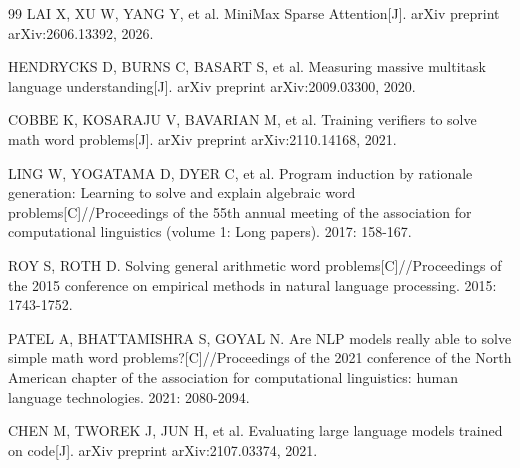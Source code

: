 \begin{thebibliography}{99}
LAI X, XU W, YANG Y, et al. MiniMax Sparse Attention[J]. arXiv preprint arXiv:2606.13392, 2026.

HENDRYCKS D, BURNS C, BASART S, et al. Measuring massive multitask language understanding[J]. arXiv preprint arXiv:2009.03300, 2020.

COBBE K, KOSARAJU V, BAVARIAN M, et al. Training verifiers to solve math word problems[J]. arXiv preprint arXiv:2110.14168, 2021.

LING W, YOGATAMA D, DYER C, et al. Program induction by rationale generation: Learning to solve and explain algebraic word problems[C]//Proceedings of the 55th annual meeting of the association for computational linguistics (volume 1: Long papers). 2017: 158-167.

ROY S, ROTH D. Solving general arithmetic word problems[C]//Proceedings of the 2015 conference on empirical methods in natural language processing. 2015: 1743-1752.

PATEL A, BHATTAMISHRA S, GOYAL N. Are NLP models really able to solve simple math word problems?[C]//Proceedings of the 2021 conference of the North American chapter of the association for computational linguistics: human language technologies. 2021: 2080-2094.

CHEN M, TWOREK J, JUN H, et al. Evaluating large language models trained on code[J]. arXiv preprint arXiv:2107.03374, 2021.

\end{thebibliography}
